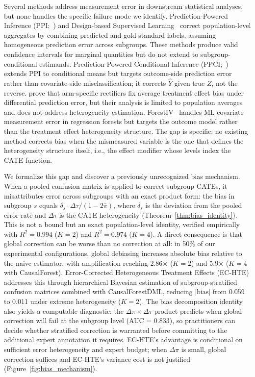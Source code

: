 Several methods address measurement error in downstream statistical analyses, but none handles the specific failure mode we identify.
Prediction-Powered Inference (PPI;~\citealt{angelopoulos2023ppi}) and Design-based Supervised Learning~\cite{egami2024dsl} correct population-level aggregates by combining predicted and gold-standard labels, assuming homogeneous prediction error across subgroups.
These methods produce valid confidence intervals for marginal quantities but do not extend to subgroup-conditional estimands.
Prediction-Powered Conditional Inference (PPCI;~\citealt{sui2026ppci}) extends PPI to conditional means but targets outcome-side prediction error rather than covariate-side misclassification; it corrects $\hat{Y}$ given true $Z$, not the reverse.
\citet{mozer2026ppi} prove that arm-specific rectifiers fix average treatment effect bias under differential prediction error, but their analysis is limited to population averages and does not address heterogeneity estimation.
ForestIV~\cite{bu2023forestiv} handles ML-covariate measurement error in regression forests but targets the outcome model rather than the treatment effect heterogeneity structure.
The gap is specific: no existing method corrects bias when the mismeasured variable is the one that defines the heterogeneity structure itself, i.e., the effect modifier whose levels index the CATE function.

We formalize this gap and discover a previously unrecognized bias mechanism.
When a pooled confusion matrix is applied to correct subgroup CATEs, it misattributes error across subgroups with an exact product form: the bias in subgroup $s$ equals $\delta_s \cdot \Delta\tau / (1 - 2\bar{\pi})$, where $\delta_s$ is the deviation from the pooled error rate and $\Delta\tau$ is the CATE heterogeneity (Theorem~\ref{thm:bias_identity}).
This is not a bound but an exact population-level identity, verified empirically with $R^2 = 0.994$ ($K{=}2$) and $R^2 = 0.974$ ($K{=}4$).
A direct consequence is that global correction can be worse than no correction at all: in 50\% of our experimental configurations, global debiasing increases absolute bias relative to the naive estimator, with amplification reaching 2.86$\times$ ($K{=}2$) and 5.9$\times$ ($K{=}4$ with CausalForest).
Error-Corrected Heterogeneous Treatment Effects (EC-HTE) addresses this through hierarchical Bayesian estimation of subgroup-stratified confusion matrices combined with CausalForestDML, reducing $|\text{bias}|$ from 0.059 to 0.011 under extreme heterogeneity ($K{=}2$).
The bias decomposition identity also yields a computable diagnostic: the $\Delta\pi \times \Delta\tau$ product predicts when global correction will fail at the subgroup level (AUC = 0.833), so practitioners can decide whether stratified correction is warranted before committing to the additional expert annotation it requires.
EC-HTE's advantage is conditional on sufficient error heterogeneity and expert budget; when $\Delta\pi$ is small, global correction suffices and EC-HTE's variance cost is not justified (Figure~\ref{fig:bias_mechanism}).

